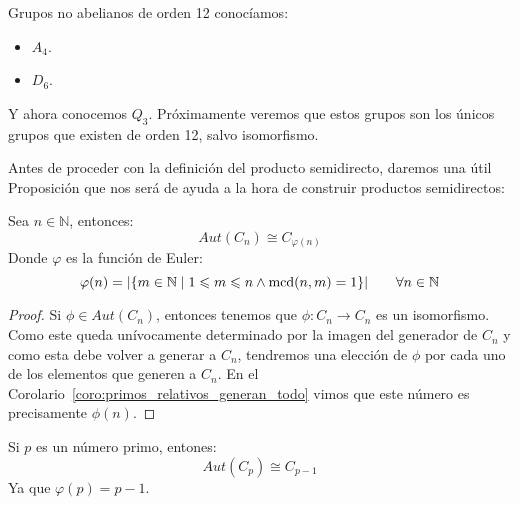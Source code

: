 \begin{ejemplo}
    Grupos no abelianos de orden 12 conocíamos:
    \begin{itemize}
        \item $A_4$.
        \item $D_6$.
    \end{itemize}
    Y ahora conocemos $Q_3$. Próximamente veremos que estos grupos son los únicos grupos que existen de orden 12, salvo isomorfismo.
\end{ejemplo}

\noindent
Antes de proceder con la definición del producto semidirecto, daremos una útil Proposición que nos será de ayuda a la hora de construir productos semidirectos:
\begin{prop}\label{prop:aut_ciclico}
    Sea $n\in \mathbb{N}$, entonces:
    \begin{equation*}
        Aut(C_n) \cong C_{\varphi(n)}
    \end{equation*}
    Donde $\varphi$ es la función de Euler:
    \begin{equation*}
        \varphi(n) = |\{m\in \mathbb{N} \mid 1\leqslant m\leqslant n \land \operatorname{mcd}(n,m)=1\}| \qquad \forall n\in \mathbb{N}
    \end{equation*}
    \begin{proof}
        Si $\phi \in Aut(C_n)$, entonces tenemos que $\phi:C_n \to C_n$ es un isomorfismo. Como este queda unívocamente determinado por la imagen del generador de $C_n$ y como esta debe volver a generar a $C_n$, tendremos una elección de $\phi$ por cada uno de los elementos que generen a $C_n$. En el Corolario~\ref{coro:primos_relativos_generan_todo} vimos que este número es precisamente $\phi(n)$.
    \end{proof}
\end{prop}

\begin{observacion}
    Si $p$ es un número primo, entones:
    \begin{equation*}
        Aut(C_p) \cong C_{p-1}
    \end{equation*}
    Ya que $\varphi(p) = p-1$.
\end{observacion}

